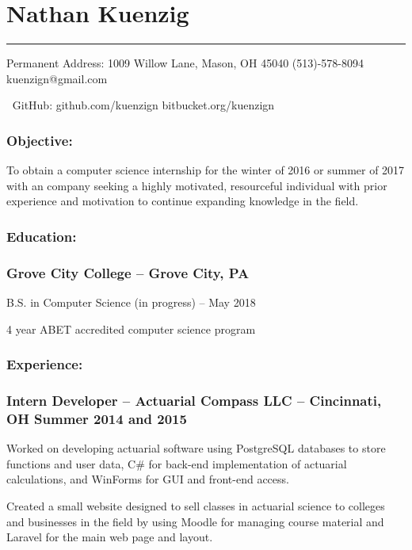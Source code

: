 \documentclass[12pt]{article}
\begin{document}
{
	\centering\section*{\color{head}Nathan Kuenzig}
	\vspace{-7mm}
	\noindent\color{head2}\rule{\textwidth}{1pt}
		
	{\footnotesize {\color{accent}Permanent Address:} 1009 Willow Lane, Mason, OH 45040  (513)-578-8094  kuenzign@gmail.com
			
		{\color{accent}\faGithub $\:$ GitHub:} github.com/kuenzign  bitbucket.org/kuenzign}
	
}
\vspace{-5mm}
\subsubsection*{\color{head}Objective:}
\small To obtain a computer science internship for the winter of 2016 or summer of 2017 with an company seeking a highly motivated, resourceful individual with prior experience and motivation to continue expanding knowledge in the field.

\subsubsection*{\color{head}Education:}
\subsubsection*{\textnormal{{\color{accent} Grove City College }\color{head} -- Grove City, PA}}
\vspace{-2mm}
\noindent\hspace{2.25pc} B.S. in Computer Science (in progress) -- May 2018

\noindent\hspace{2.25pc} 4 year ABET accredited computer science program

\subsubsection*{\color{head}Experience:}
\subsubsection*{\textnormal{{\color{accent} Intern Developer }\color{head} -- Actuarial Compass LLC -- Cincinnati, OH	\hfill Summer 2014 and 2015}}
\vspace{-2mm}
\begin{compactitem}
	\item Worked on developing actuarial software using PostgreSQL databases to store functions and user data, C\# for back-end implementation of actuarial calculations, and WinForms for GUI and front-end access.
	\item Created a small website designed to sell classes in actuarial science to colleges and businesses in the field by using Moodle for managing course material and Laravel for the main web page and layout.
\end{compactitem}
\vspace{-4.5mm}
\end{document}
